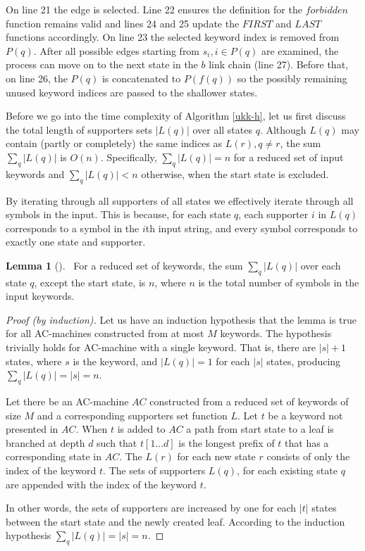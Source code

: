 \documentclass[english,twoside,censored,csm,algorithms-track-2020]{HYthesisML}
\theoremstyle{plain}
\theoremstyle{definition}
\newtheorem{lemma}[theorem]{Lemma}
\numberwithin{testexample}{chapter}
\begin{document}
On line 21 the edge is selected. Line 22 ensures the definition for the $forbidden$ function
remains valid and lines 24 and 25 update the $FIRST$ and $LAST$ functions accordingly. On line
23 the selected keyword index is removed from $P(q)$. After all possible edges starting from
$s_i, i\in {P(q)}$ are examined, the process can move on to the next state in the $b$ link chain (line 27).
Before that, on line 26, the $P(q)$ is concatenated to $P(f(q))$ so the possibly remaining unused
keyword indices are passed to the shallower states.

Before we go into the time complexity of Algorithm \ref{ukk-h}, let us first discuss the
total length of supporters sets $|L(q)|$ over all states $q$. Although $L(q)$ may contain
(partly or completely)
the same indices as $L(r), q\neq r$, the sum $\sum_q |L(q)|$ is $O(n)$. Specifically,
$\sum_q |L(q)| = n$ for a reduced set of input keywords and $\sum_q |L(q)| < n$ otherwise,
when the start state is excluded.

By iterating
through all supporters of all states we effectively iterate through all symbols
in the input. This is because, for each state $q$, each supporter $i$ in $L(q)$ corresponds to a
symbol in the $i$th input string, and every symbol corresponds to exactly one state and supporter.

\begin{lemma}[]~\label{lem-supporters}
  For a reduced set of keywords, the sum $\sum_q |L(q)|$ over each state $q$, except the start state,
  is $n$, where $n$ is the
  total number of symbols in the input keywords.
\end{lemma}
\begin{proof}[Proof (by induction)]
  Let us have an induction hypothesis that the lemma is true for all AC-machines constructed from 
  at most $M$ keywords. The hypothesis trivially holds for AC-machine with a single keyword. That is,
  there are $|s|+1$ states, where $s$ is the keyword, and $|L(q)| = 1$ for each $|s|$ states,
  producing $\sum_q |L(q)| = |s| = n$.

  Let there be an AC-machine $AC$ constructed from a reduced set of keywords of size $M$ and a
  corresponding supporters set function $L$. Let $t$ be a keyword not presented in $AC$.
  When $t$ is added to $AC$ a path from start state to a leaf is branched at depth $d$ such that
  $t[1...d]$ is the longest prefix of $t$ that has a corresponding state in $AC$. The $L(r)$ for
  each new state $r$ consists of only the index of the keyword $t$. The sets of supporters $L(q)$,
  for each existing state $q$ are appended with the index of the keyword $t$.

  In other words, the sets of supporters are increased by one for each $|t|$ states between
  the start state and the newly created leaf. According to the induction hypothesis
  $\sum_q |L(q)| = |s| = n$.
\end{proof}
\end{document}

